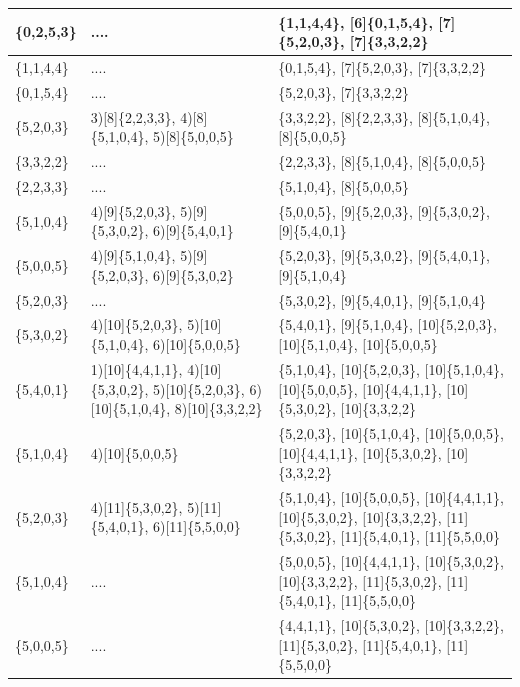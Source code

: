 \documentclass{article}
\begin{document}
\begin{center}
\begin{longtable}{ |p{2cm}|p{2cm}|>{\raggedright\arraybackslash}p{7cm}|  }
    \hline
    [6]\{0,2,5,3\} & .... & [6]\{1,1,4,4\}, [6]\{0,1,5,4\}, [7]\{5,2,0,3\}, [7]\{3,3,2,2\} \\ 
    \hline
    [6]\{1,1,4,4\} & .... & [6]\{0,1,5,4\}, [7]\{5,2,0,3\}, [7]\{3,3,2,2\} \\ 
    \hline
    [6]\{0,1,5,4\} & .... & [7]\{5,2,0,3\}, [7]\{3,3,2,2\} \\ 
    \hline
    [7]\{5,2,0,3\} & 3)[8]\{2,2,3,3\}, 4)[8]\{5,1,0,4\}, 5)[8]\{5,0,0,5\} & [7]\{3,3,2,2\}, [8]\{2,2,3,3\}, [8]\{5,1,0,4\}, [8]\{5,0,0,5\} \\ 
    \hline
    [7]\{3,3,2,2\} & .... & [8]\{2,2,3,3\}, [8]\{5,1,0,4\}, [8]\{5,0,0,5\} \\ 
    \hline
    [8]\{2,2,3,3\} & .... & [8]\{5,1,0,4\}, [8]\{5,0,0,5\} \\ 
    \hline
    [8]\{5,1,0,4\} & 4)[9]\{5,2,0,3\}, 5)[9]\{5,3,0,2\}, 6)[9]\{5,4,0,1\} & [8]\{5,0,0,5\}, [9]\{5,2,0,3\}, [9]\{5,3,0,2\}, [9]\{5,4,0,1\} \\ 
    \hline
    [8]\{5,0,0,5\} & 4)[9]\{5,1,0,4\}, 5)[9]\{5,2,0,3\}, 6)[9]\{5,3,0,2\} & [9]\{5,2,0,3\}, [9]\{5,3,0,2\}, [9]\{5,4,0,1\}, [9]\{5,1,0,4\} \\ 
    \hline
    [9]\{5,2,0,3\} & .... & [9]\{5,3,0,2\}, [9]\{5,4,0,1\}, [9]\{5,1,0,4\} \\ 
    \hline
    [9]\{5,3,0,2\} & 4)[10]\{5,2,0,3\}, 5)[10]\{5,1,0,4\}, 6)[10]\{5,0,0,5\} & [9]\{5,4,0,1\}, [9]\{5,1,0,4\}, [10]\{5,2,0,3\}, [10]\{5,1,0,4\}, [10]\{5,0,0,5\} \\ 
    \hline
    [9]\{5,4,0,1\} & 1)[10]\{4,4,1,1\}, 4)[10]\{5,3,0,2\}, 5)[10]\{5,2,0,3\}, 6)[10]\{5,1,0,4\}, 8)[10]\{3,3,2,2\} & [9]\{5,1,0,4\}, [10]\{5,2,0,3\}, [10]\{5,1,0,4\}, [10]\{5,0,0,5\}, [10]\{4,4,1,1\}, [10]\{5,3,0,2\}, [10]\{3,3,2,2\} \\ 
    \hline
    [9]\{5,1,0,4\} & 4)[10]\{5,0,0,5\} & [10]\{5,2,0,3\}, [10]\{5,1,0,4\}, [10]\{5,0,0,5\}, [10]\{4,4,1,1\}, [10]\{5,3,0,2\}, [10]\{3,3,2,2\} \\ 
    \hline
    [10]\{5,2,0,3\} & 4)[11]\{5,3,0,2\}, 5)[11]\{5,4,0,1\}, 6)[11]\{5,5,0,0\} & [10]\{5,1,0,4\}, [10]\{5,0,0,5\}, [10]\{4,4,1,1\}, [10]\{5,3,0,2\}, [10]\{3,3,2,2\}, [11]\{5,3,0,2\}, [11]\{5,4,0,1\}, [11]\{5,5,0,0\} \\ 
    \hline
    [10]\{5,1,0,4\} & .... & [10]\{5,0,0,5\}, [10]\{4,4,1,1\}, [10]\{5,3,0,2\}, [10]\{3,3,2,2\}, [11]\{5,3,0,2\}, [11]\{5,4,0,1\}, [11]\{5,5,0,0\} \\ 
    \hline
    [10]\{5,0,0,5\} & .... & [10]\{4,4,1,1\}, [10]\{5,3,0,2\}, [10]\{3,3,2,2\}, [11]\{5,3,0,2\}, [11]\{5,4,0,1\}, [11]\{5,5,0,0\} \\ 

\end{longtable}
\end{center}
\end{document}
